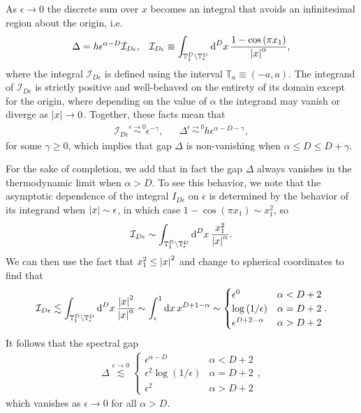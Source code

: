 \documentclass[nofootinbib,notitlepage,11pt]{revtex4-2}
\newcommand{\f}[2]{\dfrac{#1}{#2}} %
\newcommand{\p}[1]{\left(#1\right)} %
\newcommand{\1}{\mathds{1}}
\renewcommand{\d}{\text{d}}
\newcommand{\I}{\mathcal{I}}
\newcommand{\TT}{\mathbb{T}}
\begin{document}
As $\epsilon\to0$ the discrete sum over $x$ becomes an integral that
avoids an infinitesimal region about the origin, i.e.
\begin{align}
  \Delta = h \epsilon^{\alpha-D} \I_{D\epsilon},
  &&
  \I_{D\epsilon}
  \equiv \int_{\TT_1^D\setminus\TT_\epsilon^D} \d^Dx\,
  \f{1-\cos\p{\pi x_1}}{\abs{x}^\alpha},
\end{align}
where the integral $\I_{D\epsilon}$ is defined using the interval
$\TT_a\equiv\p{-a,a}$.  The integrand of $\I_{D\epsilon}$ is strictly
positive and well-behaved on the entirety of its domain except for the
origin, where depending on the value of $\alpha$ the integrand may
vanish or diverge as $\abs{x}\to0$.  Together, these facts mean that
\begin{align}
  \I_{D\epsilon} \stackrel{\epsilon\to0}{\sim} \epsilon^{-\gamma},
  &&
  \Delta \stackrel{\epsilon\to0}{\sim} h \epsilon^{\alpha-D-\gamma},
\end{align}
for some $\gamma\ge0$, which implies that gap $\Delta$ is
non-vanishing when $\alpha\le D\le D+\gamma$.

For the sake of completion, we add that in fact the gap $\Delta$
always vanishes in the thermodynamic limit when $\alpha>D$.  To see
this behavior, we note that the asymptotic dependence of the integral
$I_{D\epsilon}$ on $\epsilon$ is determined by the behavior of its
integrand when $\abs{x}\sim\epsilon$, in which case
$1-\cos\p{\pi x_1}\sim x_1^2$, so
\begin{align}
  \I_{D\epsilon}
  \sim \int_{\TT_1^D\setminus\TT_\epsilon^D} \d^Dx\,
  \f{x_1^2}{\abs{x}^\alpha}.
\end{align}
We can then use the fact that $x_1^2\le\abs{x}^2$ and change to
spherical coordinates to find that
\begin{align}
  \I_{D\epsilon} \lesssim
  \int_{\TT_1^D\setminus\TT_\epsilon^D} \d^Dx\,
  \f{\abs{x}^2}{\abs{x}^\alpha}
  \sim \int_\epsilon^1 \d x\, x^{D+1-\alpha}
  \sim
  \begin{cases}
    \epsilon^0 & \alpha < D+2 \\
    \log\p{1/\epsilon} & \alpha = D+2 \\
    \epsilon^{D+2-\alpha} & \alpha > D+2
  \end{cases}.
\end{align}
It follows that the spectral gap
\begin{align}
  \Delta \stackrel{\epsilon\to0}{\lesssim}
  \begin{cases}
    \epsilon^{\alpha-D} & \alpha < D+2 \\
    \epsilon^2 \log\p{1/\epsilon} & \alpha = D + 2 \\
    \epsilon^2 & \alpha > D+2
  \end{cases},
\end{align}
which vanishes as $\epsilon\to0$ for all $\alpha>D$.
\end{document}
